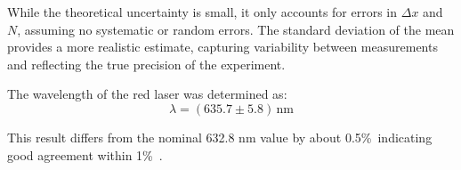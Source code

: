 While the theoretical uncertainty is small, it only accounts for errors in \(\Delta x\) and \(N\), assuming no systematic or random errors. The standard deviation of the mean provides a more realistic estimate, capturing variability between measurements and reflecting the true precision of the experiment.  

The wavelength of the red laser was determined as:  
\[
\lambda = (635.7 \pm 5.8) \, \text{nm}
\]  

This result differs from the nominal 632.8 nm value by about 0.5\%\, indicating good agreement within 1\%\ .

